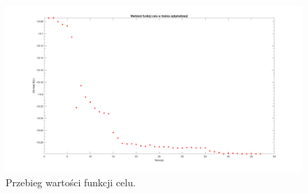 \documentclass{article}
\begin{document}
\pagebreak
\begin{landscape}
	\begin{figure}[h]
		\vspace*{-2cm}
		\includegraphics[width=25cm,height=15 cm]{graphics/fval.png}
		\centering
		\caption{Przebieg wartości funkcji celu.}
	\end{figure}
\end{landscape}
\end{document}
